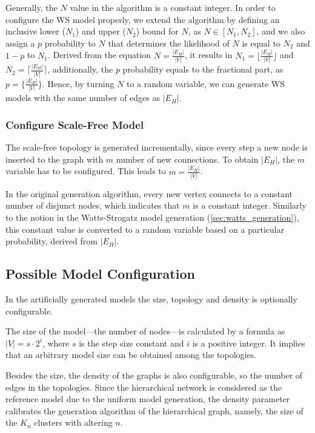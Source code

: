 Generally, the $N$ value in the algorithm is a constant integer. In order to configure the WS model properly, we extend the algorithm by defining an inclusive lower ($N_1$) and upper ($N_2$) bound for $N$, as $N\in[N_1, N_2]$, and we also assign a $p$ probability to $N$ that determines the likelihood of $N$ is equal to $N_2$ and $1-p$ to $N_1$. Derived from the equation $N = \frac{|E_H|}{|V|}$, it results in $N_1 = \Big\lfloor\frac{|E_H|}{|V|}\Big\rfloor$ and $N_2 = \Big\lceil\frac{|E_H|}{|V|}\Big\rceil$, additionally, the $p$ probability equals to the fractional part, as $p = \Big\{\frac{|E_H|}{|V|}\Big\}$. Hence, by turning $N$ to a random variable, we can generate WS models with the same number of edges as $|E_H|$.

\subsubsection{Configure Scale-Free Model}

The scale-free topology is generated incrementally, since every step a new node is inserted to the graph with $m$ number of new connections. To obtain $|E_H|$, the $m$ variable has to be configured. This leads to $m = \frac{|E_H|}{|V|}$.

In the original generation algorithm, every new vertex connects to a constant number of disjunct nodes, which indicates that $m$ is a constant integer. Similarly to the notion in the Watts-Strogatz model generation (\ref{sec:watts_generation}), this constant value is converted to a random variable based on a particular probability, derived from $|E_H|$.

\subsection{Possible Model Configuration}

In the artificially generated models the size, topology and density is optionally configurable. 

The size of the model---the number of nodes---is calculated by a formula as $|V| = s \cdot 2^i$, where $s$ is the step size constant and $i$ is a positive integer. It implies that an arbitrary model size can be obtained among the topologies.

Besides the size, the density of the graphs is also configurable, so the number of edges in the topologies. Since the hierarchical network is considered as the reference model due to the uniform model generation, the density parameter calibrates the generation algorithm of the hierarchical graph, namely, the size of the $K_n$ clusters with altering $n$. 


